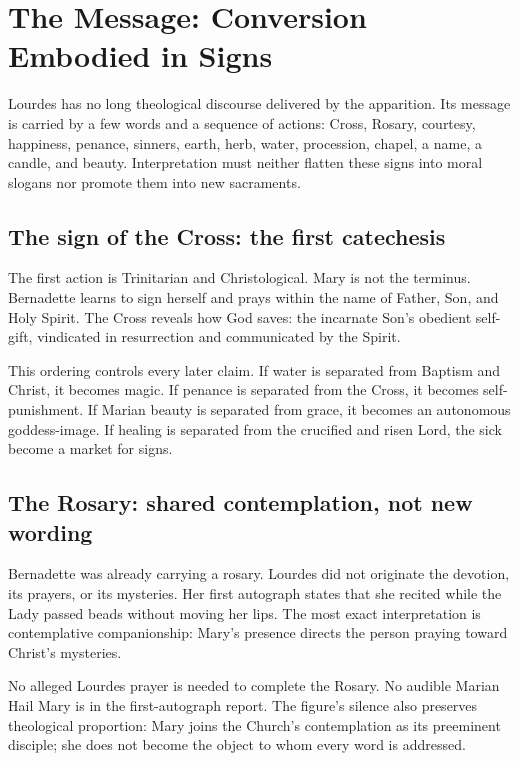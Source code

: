 \section{The Message: Conversion Embodied in Signs}

Lourdes has no long theological discourse delivered by the apparition. Its message is carried by a few words and a sequence of actions: Cross, Rosary, courtesy, happiness, penance, sinners, earth, herb, water, procession, chapel, a name, a candle, and beauty. Interpretation must neither flatten these signs into moral slogans nor promote them into new sacraments.

\subsection{The sign of the Cross: the first catechesis}

The first action is Trinitarian and Christological. Mary is not the terminus. Bernadette learns to sign herself and prays within the name of Father, Son, and Holy Spirit. The Cross reveals how God saves: the incarnate Son's obedient self-gift, vindicated in resurrection and communicated by the Spirit.

This ordering controls every later claim. If water is separated from Baptism and Christ, it becomes magic. If penance is separated from the Cross, it becomes self-punishment. If Marian beauty is separated from grace, it becomes an autonomous goddess-image. If healing is separated from the crucified and risen Lord, the sick become a market for signs.

\subsection{The Rosary: shared contemplation, not new wording}

Bernadette was already carrying a rosary. Lourdes did not originate the devotion, its prayers, or its mysteries. Her first autograph states that she recited while the Lady passed beads without moving her lips. The most exact interpretation is contemplative companionship: Mary's presence directs the person praying toward Christ's mysteries.

No alleged Lourdes prayer is needed to complete the Rosary. No audible Marian Hail Mary is in the first-autograph report. The figure's silence also preserves theological proportion: Mary joins the Church's contemplation as its preeminent disciple; she does not become the object to whom every word is addressed.

